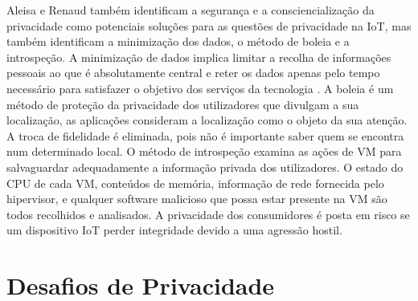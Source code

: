 \documentclass[conference]{IEEEtran}
\begin{document}
Aleisa e Renaud \cite{aleisa2016privacy} também identificam a segurança e a
consciencialização da privacidade como potenciais soluções para as questões de
privacidade na IoT, mas também identificam a minimização dos
dados, o método de boleia e a introspeção. A minimização de dados implica limitar a
recolha de informações pessoais ao que é absolutamente central e reter os
dados apenas pelo tempo necessário para satisfazer o objetivo dos serviços
da tecnologia \cite{ojDirective281}. A boleia \cite{tang2006putting} é um
método de proteção da privacidade dos utilizadores que divulgam a sua
localização, as aplicações consideram a localização como o objeto da sua
atenção. A troca de fidelidade é eliminada, pois não é importante saber
quem se encontra num determinado local. O método de introspeção \cite{kang2015protection}
examina as ações de VM para salvaguardar adequadamente a informação privada
dos utilizadores. O estado do CPU de cada VM, conteúdos de memória, informação
de rede fornecida pelo hipervisor, e qualquer software malicioso que possa
estar presente na VM são todos recolhidos e analisados. A privacidade dos
consumidores é posta em risco se um dispositivo IoT perder integridade devido
a uma agressão hostil.


\section{Desafios de Privacidade}
\end{document}
